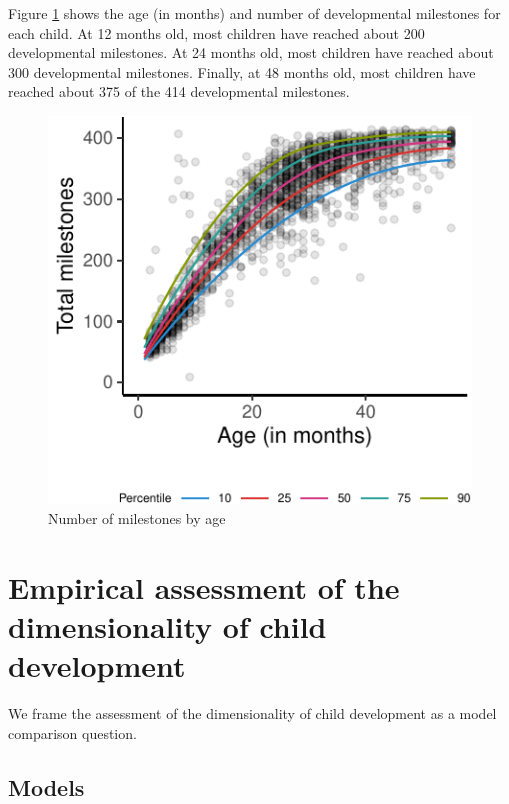 \documentclass[10pt, letterpaper]{article}
\newenvironment{CodeChunk}{}{}
\begin{document}
Figure \ref{fig:growth} shows the age (in months) and number of
developmental milestones for each child. At 12 months old, most children
have reached about 200 developmental milestones. At 24 months old, most
children have reached about 300 developmental milestones. Finally, at 48
months old, most children have reached about 375 of the 414
developmental milestones.

\begin{CodeChunk}
\begin{figure}[tb]
\includegraphics{figs/growth-1} \caption[Number of milestones by age]{Number of milestones by age}\label{fig:growth}
\end{figure}
\end{CodeChunk}

\hypertarget{empirical-assessment-of-the-dimensionality-of-child-development}{%
\section{Empirical assessment of the dimensionality of child
development}\label{empirical-assessment-of-the-dimensionality-of-child-development}}

We frame the assessment of the dimensionality of child development as a
model comparison question.

\hypertarget{models}{%
\subsection{Models}\label{models}}
\end{document}

